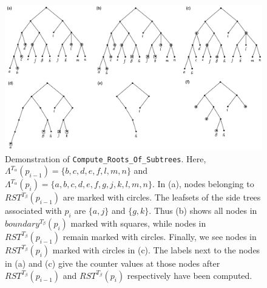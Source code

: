 \documentclass{article}
\newcommand{\leafset}{\Lambda}
\newcommand{\TA}{T_\alpha}
\newcommand{\TB}{T_\beta}
\begin{document}
    \begin{figure}[h]
        \includegraphics[scale=0.45]{rootsofsubtreesrecursive}
        \centering
        \caption{Demonstration of \texttt{Compute\_Roots\_Of\_Subtrees}. Here, $\leafset^{\TA}(p_{i-1}) = \{b, c, d, e, f, l, m, n\}$ and $\leafset^{\TA}(p_i) = \{a, b, c, d, e, f, g, j, k, l, m, n\}$. In (a), nodes belonging to $RST^{\TB}(p_{i-1})$ are marked with circles. The leafsets of the side trees associated with $p_i$ are $\{a, j\}$ and $\{g, k\}$. Thus (b) shows all nodes in $boundary^{\TB}(p_i)$ marked with squares, while nodes in $RST^{\TB}(p_{i-1})$ remain marked with circles. Finally, we see nodes in $RST^{\TB}(p_i)$ marked with circles in (c). The labels next to the nodes in (a) and (c) give the counter values at those nodes after $RST^{\TB}(p_{i-1})$ and $RST^{\TB}(p_i)$ respectively have been computed.}
        \label{fig:rootsofsubtreesrecursive}
    \end{figure}


\end{document}
